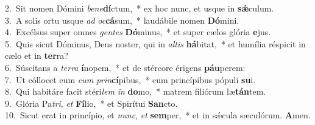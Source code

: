 {2.~}Sit nomen Dómini \textit{be}\textit{ne}\textbf{dí}ctum,~* ex hoc nunc, et usque in \textbf{sǽ}culum.\\
{3.~}A solis ortu usque \textit{ad} \textit{oc}\textbf{cá}sum,~* laudábile nomen \textbf{Dó}mini.\\
{4.~}Excélsus super omnes \textit{gen}\textit{tes} \textbf{Dó}minus,~* et super cælos glória \textbf{e}jus.\\
{5.~}Quis sicut Dóminus, Deus noster, qui in \textit{al}\textit{tis} \textbf{há}bitat,~* et humília réspicit in cælo et in \textbf{ter}ra?\\
{6.~}Súscitans a \textit{ter}\textit{ra} \textbf{í}nopem,~* et de stércore érigens \textbf{páu}perem:\\
{7.~}Ut cóllocet eum \textit{cum} \textit{prin}\textbf{cí}pibus,~* cum princípibus pópuli \textbf{su}i.\\
{8.~}Qui habitáre facit stéri\textit{lem} \textit{in} \textbf{do}mo,~* matrem filiórum læ\textbf{tán}tem.\\
{9.~}Glória Pa\textit{tri}, \textit{et} \textbf{Fí}lio,~* et Spirítui \textbf{San}cto.\\
{10.~}Sicut erat in princípio, et \textit{nunc}, \textit{et} \textbf{sem}per,~* et in sǽcula sæculórum. \textbf{A}men.\\
